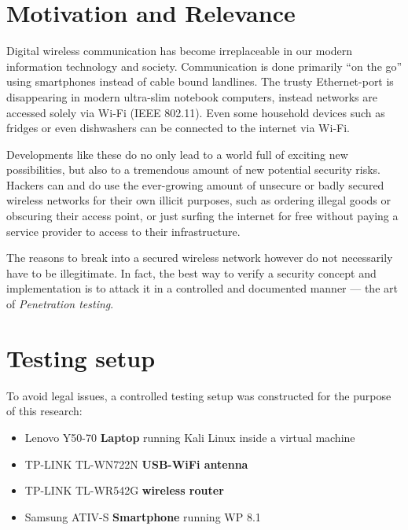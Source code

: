 \section{Motivation and Relevance}

Digital wireless communication has become irreplaceable in our modern information technology and society. Communication is done primarily “on the go” using smartphones instead of cable bound landlines. The trusty Ethernet-port is disappearing in modern ultra-slim notebook computers, instead networks are accessed solely via Wi-Fi (IEEE 802.11). Even some household devices such as fridges or even dishwashers can be connected to the internet via Wi-Fi.

Developments like these do no only lead to a world full of exciting new possibilities, but also to a tremendous amount of new potential security risks. Hackers can and do use the ever-growing amount of unsecure or badly secured wireless networks for their own illicit purposes, such as ordering illegal goods or obscuring their access point, or just surfing the internet for free without paying a service provider to access to their infrastructure.  

The reasons to break into a secured wireless network however do not necessarily have to be illegitimate. In fact, the best way to verify a security concept and implementation is to attack it in a controlled and documented manner --- the art of \emph{Penetration testing}.

\section{Testing setup}

To avoid legal issues, a controlled testing setup was constructed for the purpose of this research:

\begin{itemize}

\item{Lenovo Y50-70 \textbf{Laptop} running Kali Linux \cite{OffSec17} inside a virtual machine}

\item{TP-LINK TL-WN722N \textbf{USB-WiFi antenna}}

\item{TP-LINK TL-WR542G \textbf{wireless router}}

\item{Samsung ATIV-S \textbf{Smartphone} running WP 8.1}

\end{itemize}

